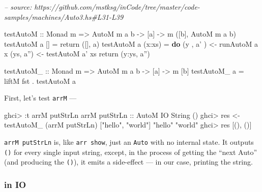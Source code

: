 \documentclass[]{article}
\newenvironment{Shaded}{}{}
\newcommand{\CommentTok}[1]{\textcolor[rgb]{0.38,0.63,0.69}{\textit{#1}}}
\newcommand{\DataTypeTok}[1]{\textcolor[rgb]{0.56,0.13,0.00}{#1}}
\newcommand{\FunctionTok}[1]{\textcolor[rgb]{0.02,0.16,0.49}{#1}}
\newcommand{\KeywordTok}[1]{\textcolor[rgb]{0.00,0.44,0.13}{\textbf{#1}}}
\newcommand{\NormalTok}[1]{#1}
\newcommand{\OtherTok}[1]{\textcolor[rgb]{0.00,0.44,0.13}{#1}}
\newcommand{\StringTok}[1]{\textcolor[rgb]{0.25,0.44,0.63}{#1}}
\begin{document}
\begin{Shaded}
\begin{Highlighting}[]
\CommentTok{-- source: https://github.com/mstksg/inCode/tree/master/code-samples/machines/Auto3.hs#L31-L39}

\OtherTok{testAutoM ::} \DataTypeTok{Monad}\NormalTok{ m }\OtherTok{=>} \DataTypeTok{AutoM}\NormalTok{ m a b }\OtherTok{->}\NormalTok{ [a] }\OtherTok{->}\NormalTok{ m ([b], }\DataTypeTok{AutoM}\NormalTok{ m a b)}
\NormalTok{testAutoM a []      }\FunctionTok{=}\NormalTok{ return ([], a)}
\NormalTok{testAutoM a (x}\FunctionTok{:}\NormalTok{xs)  }\FunctionTok{=} \KeywordTok{do}
\NormalTok{    (y , a' ) }\OtherTok{<-}\NormalTok{ runAutoM a x}
\NormalTok{    (ys, a'') }\OtherTok{<-}\NormalTok{ testAutoM a' xs}
\NormalTok{    return (y}\FunctionTok{:}\NormalTok{ys, a'')}

\OtherTok{testAutoM_ ::} \DataTypeTok{Monad}\NormalTok{ m }\OtherTok{=>} \DataTypeTok{AutoM}\NormalTok{ m a b }\OtherTok{->}\NormalTok{ [a] }\OtherTok{->}\NormalTok{ m [b]}
\NormalTok{testAutoM_ a }\FunctionTok{=}\NormalTok{ liftM fst }\FunctionTok{.}\NormalTok{ testAutoM a}
\end{Highlighting}
\end{Shaded}

First, let's test \texttt{arrM} ---

\begin{Shaded}
\begin{Highlighting}[]
\NormalTok{ghci}\FunctionTok{>} \FunctionTok{:}\NormalTok{t arrM putStrLn}
\NormalTok{arrM}\OtherTok{ putStrLn ::} \DataTypeTok{AutoM} \DataTypeTok{IO} \DataTypeTok{String}\NormalTok{ ()}
\NormalTok{ghci}\FunctionTok{>}\NormalTok{ res }\OtherTok{<-}\NormalTok{ testAutoM_ (arrM putStrLn) [}\StringTok{"hello"}\NormalTok{, }\StringTok{"world"}\NormalTok{]}
\StringTok{"hello"}
\StringTok{"world"}
\NormalTok{ghci}\FunctionTok{>}\NormalTok{ res}
\NormalTok{[(), ()]}
\end{Highlighting}
\end{Shaded}

\texttt{arrM\ putStrLn} is, like \texttt{arr\ show}, just an \texttt{Auto} with
no internal state. It outputs \texttt{()} for every single input string, except,
in the process of getting the ``next Auto'' (and producing the \texttt{()}), it
emits a side-effect --- in our case, printing the string.

\hypertarget{in-io}{%
\subsubsection{in IO}\label{in-io}}
\end{document}
